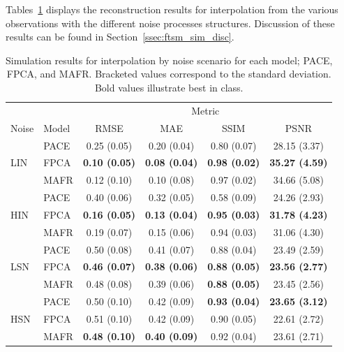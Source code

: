 Tables~\ref{tab:ftsm_sim_interp} displays the reconstruction results for interpolation from the various observations with the different noise processes structures. 
Discussion of these results can be found in Section~\ref{ssec:ftsm_sim_disc}. 

\begin{table}[htbp!] 
	\caption[Simulation results for interpolation by noise scenario with the three models under consideration.]{Simulation results for interpolation by noise scenario for each model; PACE, FPCA, and MAFR. Bracketed values correspond to the standard deviation. Bold values illustrate best in class.}
	\centering
	\label{tab:ftsm_sim_interp}
	\begin{tabular}{l l c c c c}
		\toprule
		& & \multicolumn{4}{c}{Metric} \\ 
		Noise & Model & RMSE & MAE & SSIM & PSNR \\
		\midrule
		\multirow{3}{*}{LIN}& PACE & 0.25 (0.05) & 0.20 (0.04) & 0.80 (0.07) & 28.15 (3.37) \\
		& FPCA  & \textbf{0.10 (0.05)} & \textbf{0.08 (0.04)} & \textbf{0.98 (0.02)} & \textbf{35.27 (4.59)} \\
		& MAFR  & 0.12 (0.10) & 0.10 (0.08) & 0.97 (0.02)  & 34.66 (5.08) \\
		\midrule
		\multirow{3}{*}{HIN} & PACE & 0.40 (0.06) & 0.32 (0.05) & 0.58 (0.09) & 24.26 (2.93) \\
		& FPCA  & \textbf{0.16 (0.05)} & \textbf{0.13 (0.04)} & \textbf{0.95 (0.03)} & \textbf{31.78 (4.23)} \\
		& MAFR  & 0.19 (0.07) & 0.15 (0.06) & 0.94 (0.03)  & 31.06 (4.30) \\
		\midrule
		\multirow{3}{*}{LSN} & PACE & 0.50 (0.08) & 0.41 (0.07) & 0.88 (0.04) & 23.49 (2.59) \\
		& FPCA  & \textbf{0.46 (0.07)} & \textbf{0.38 (0.06)} & \textbf{0.88 (0.05)} & \textbf{23.56 (2.77)} \\
		& MAFR  & 0.48 (0.08) & 0.39 (0.06) & \textbf{0.88 (0.05)}  & 23.45 (2.56)\\
		\midrule
		\multirow{3}{*}{HSN} & PACE & 0.50 (0.10) & 0.42 (0.09) & \textbf{0.93 (0.04)} & \textbf{23.65 (3.12)}  \\
		& FPCA  & 0.51 (0.10) & 0.42 (0.09) & 0.90 (0.05) & 22.61 (2.72) \\
		& MAFR  & \textbf{0.48 (0.10)} & \textbf{0.40 (0.09)} & 0.92 (0.04) & 23.61 (2.71) \\
		\bottomrule
	\end{tabular}
\end{table}

